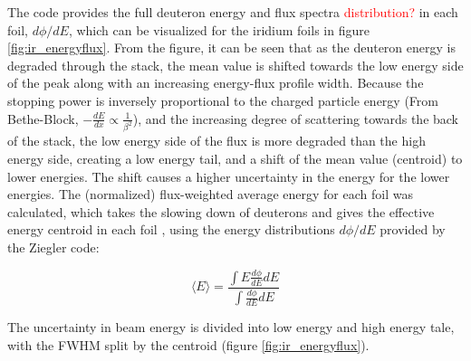 The code provides the full deuteron energy and flux spectra \textcolor{red}{distribution?} in each foil, $d\phi/dE$, which can be visualized for the iridium foils in figure \ref{fig:ir_energyflux}.  From the figure, it can be seen that as the deuteron energy is degraded through the stack, the mean value is shifted towards the low energy side of the peak along with an increasing energy-flux profile width. Because the stopping power is inversely proportional to the charged particle energy (From Bethe-Block, $-\frac{dE}{dx}\propto \frac{1}{\beta^2}$), and the increasing degree of scattering towards the back of the stack, the low energy side of the flux is more degraded than the high energy side, creating a low energy tail, and a shift of the mean value (centroid) to lower energies. The shift causes a higher uncertainty in the energy for the lower energies. The (normalized) flux-weighted average energy for each foil was calculated, which takes the slowing down of deuterons and gives the effective energy centroid in each foil \cite{Voyles2019}, using the energy distributions $d\phi/dE$ provided by the Ziegler code:

\begin{equation} \label{eq:flux_weighted_average_energy}
    \langle E \rangle = \frac{\int E \frac{d\phi}{dE}dE}{\int \frac{d\phi}{dE}dE}
\end{equation}



\noindent 
The uncertainty in beam energy is divided into low energy and high energy tale, with the FWHM split by the centroid (figure \ref{fig:ir_energyflux}). \\ 

